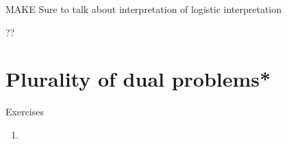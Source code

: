 MAKE Sure to talk about interpretation of logistic interpretation


?? 

\section{Plurality of dual problems*}
\label{sec:plurality_dual_problems}

\begin{xcb}{Exercises}
\begin{enumerate}[label=\thechapter.\arabic*]
\settowidth{\leftmargini}{00.00.\hskip\labelsep}
\item \label{ex:trace_norm_semidefinite} 
 



\end{enumerate}
\end{xcb}
